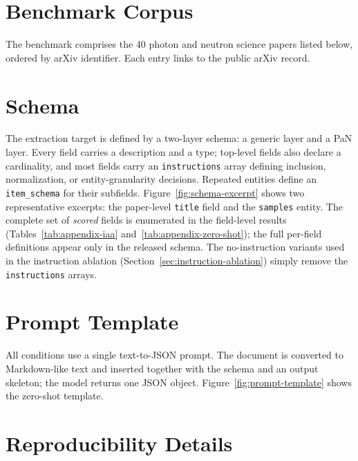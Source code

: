 \section{Benchmark Corpus}
\label{app:corpus}

The benchmark comprises the 40 photon and neutron science papers listed below,
ordered by arXiv identifier. Each entry links to the public arXiv record.



\section{Schema}
\label{app:schema}

The extraction target is defined by a two-layer schema: a generic layer and a PaN
layer. Every field carries a description and a type; top-level fields also declare
a cardinality, and most fields carry an \texttt{instructions} array defining inclusion,
normalization, or entity-granularity decisions. Repeated entities define an
\texttt{item\_schema} for their subfields. Figure~\ref{fig:schema-excerpt} shows
two representative excerpts: the paper-level \texttt{title} field and the
\texttt{samples} entity. The complete set of \emph{scored} fields is enumerated
in the field-level results (Tables~\ref{tab:appendix-iaa} and~\ref{tab:appendix-zero-shot});
the full per-field definitions appear only in the released schema. The no-instruction
variants used in the instruction ablation (Section~\ref{sec:instruction-ablation}) simply
remove the \texttt{instructions} arrays.



\section{Prompt Template}
\label{app:prompt}

All conditions use a single text-to-JSON prompt. The document is converted to
Markdown-like text and inserted together with the schema and an output
skeleton; the model returns one JSON object. Figure~\ref{fig:prompt-template}
shows the zero-shot template.



\section{Reproducibility Details}
\label{app:reproducibility}

